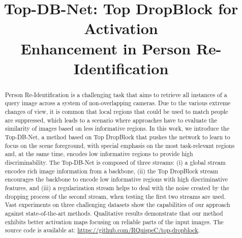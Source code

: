 \documentclass[a4paper,conference]{IEEEtran}
\begin{document}
\sloppy

\title{Top-DB-Net: Top DropBlock for Activation \\ Enhancement in Person Re-Identification}
 
\author{
}
 
\maketitle
 
\begin{abstract}
Person Re-Identification is a challenging task that aims to retrieve all instances of a query image across a system of non-overlapping cameras. Due to the various extreme changes of view, it is common that local regions that could be used to match people are suppressed, which leads to a scenario where approaches have to evaluate the similarity of images based on less informative regions. In this work, we introduce the Top-DB-Net, a method based on Top DropBlock that pushes the network to learn to focus on the scene foreground, with special emphasis on the most task-relevant regions and, at the same time, encodes low informative regions to provide high discriminability. The Top-DB-Net is composed of three streams: (i) a global stream encodes rich image information from a backbone, (ii) the Top DropBlock stream encourages the backbone to encode low informative regions with high discriminative features, and (iii) a regularization stream helps to deal with the noise created by the dropping process of the second stream, when testing the first two streams are used. Vast experiments on three challenging datasets show the capabilities of our approach against state-of-the-art methods. Qualitative results demonstrate that our method exhibits better activation maps focusing on reliable parts of the input images. The source code is available at: \href{https://github.com/RQuispeC/top-dropblock}{\url{https://github.com/RQuispeC/top-dropblock}}.
\end{abstract}
 
\end{document}
